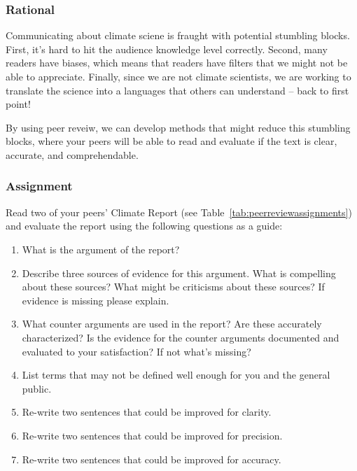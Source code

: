 
\subsubsection{Rational}

Communicating about climate sciene is fraught with potential stumbling blocks. First, it's hard to hit the audience knowledge level correctly. Second, many readers have biases, which means that readers have filters that we might not be able to appreciate. Finally, since we are not climate scientists, we are working to translate the science into a languages that others can understand -- back to first point!  

By using peer reveiw, we can develop methods that might reduce this stumbling blocks, where your peers will be able to read and evaluate if the text is clear, accurate, and comprehendable. 

\subsubsection{Assignment}

Read two of your peers' Climate Report (see Table~\ref{tab:peerreviewassignments}) and evaluate the report using the following questions as a guide:

\begin{enumerate}
  \item What is the argument of the report?
  \item Describe three sources of evidence for this argument. What is compelling about these sources? What might be criticisms about these sources? If evidence is missing please explain.
  \item What counter arguments are used in the report? Are these accurately characterized? Is the evidence for the counter arguments documented and evaluated to your satisfaction?  If not what's missing?
  \item List terms that may not be defined well enough for you and the general public. 
  \item Re-write two sentences that could be improved for clarity.
  \item Re-write two sentences that could be improved for precision.
  \item Re-write two sentences that could be improved for accuracy.
\end{enumerate}

